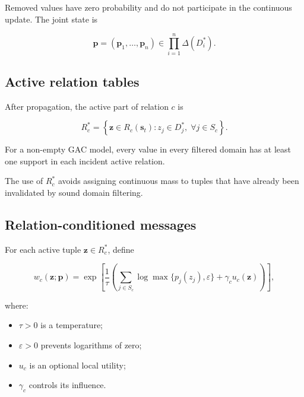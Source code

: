 \documentclass[pdflatex,sn-mathphys-num,iicol,oneside]{sn-jnl}
\begin{document}
Removed values have zero probability and do not participate in the
continuous update. The joint state is

\begin{equation}
\bm{p}
=
(\bm{p}_1,\ldots,\bm{p}_n)
\in
\prod_{i=1}^{n}\Delta(D_i^{*}).
\end{equation}

\subsection{Active relation tables}

After propagation, the active part of relation $c$ is

\begin{equation}
R_c^{*}
=
\left\{
\bm{z}\in R_c(\bm{s}_t):
z_j\in D_j^{*},
\;
\forall j\in S_c
\right\}.
\label{eq:active-relation}
\end{equation}

For a non-empty GAC model, every value in every filtered domain has at
least one support in each incident active relation.

The use of $R_c^{*}$ avoids assigning continuous mass to tuples that
have already been invalidated by sound domain filtering.

\subsection{Relation-conditioned messages}

For each active tuple $\bm{z}\in R_c^{*}$, define

\begin{equation}
w_c(\bm{z};\bm{p})
=
\exp\left[
\frac{1}{\tau}
\left(
\sum_{j\in S_c}
\log\max\{p_j(z_j),\varepsilon\}
+
\gamma_c u_c(\bm{z})
\right)
\right],
\label{eq:tuple-weight}
\end{equation}

where:

\begin{itemize}
    \item $\tau>0$ is a temperature;
    \item $\varepsilon>0$ prevents logarithms of zero;
    \item $u_c$ is an optional local utility;
    \item $\gamma_c$ controls its influence.
\end{itemize}
\end{document}
